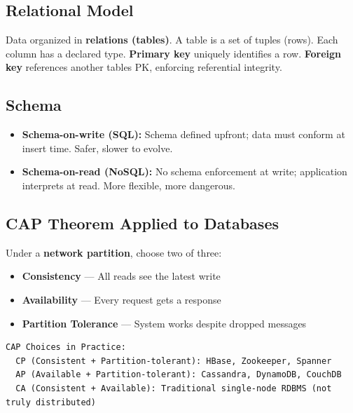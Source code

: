 \documentclass[11pt]{article}
\providecommand{\tightlist}{\setlength{\itemsep}{1pt}\setlength{\parskip}{0pt}}
\begin{document}
\subsection{Relational Model}\label{relational-model}

Data organized in \textbf{relations (tables)}. A table is a set of tuples (rows). Each column has a declared type. \textbf{Primary key} uniquely identifies a row. \textbf{Foreign key} references another table\textquotesingle s PK, enforcing referential integrity.

\subsection{Schema}\label{schema}

\begin{itemize}
\tightlist
\item
  \textbf{Schema-on-write (SQL):} Schema defined upfront; data must conform at insert time. Safer, slower to evolve.
\item
  \textbf{Schema-on-read (NoSQL):} No schema enforcement at write; application interprets at read. More flexible, more dangerous.
\end{itemize}

\subsection{CAP Theorem Applied to Databases}\label{cap-theorem-applied-to-databases}

Under a \textbf{network partition}, choose two of three:

\begin{itemize}
\tightlist
\item
  \textbf{Consistency} --- All reads see the latest write
\item
  \textbf{Availability} --- Every request gets a response
\item
  \textbf{Partition Tolerance} --- System works despite dropped messages
\end{itemize}

\setcodelang{}

\begin{verbatim}
CAP Choices in Practice:
  CP (Consistent + Partition-tolerant): HBase, Zookeeper, Spanner
  AP (Available + Partition-tolerant): Cassandra, DynamoDB, CouchDB
  CA (Consistent + Available): Traditional single-node RDBMS (not truly distributed)
\end{verbatim}
\end{document}
